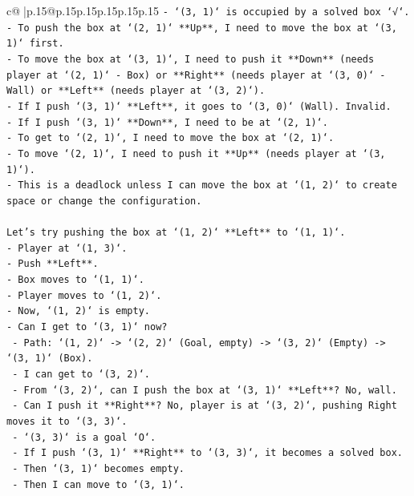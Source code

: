 \documentclass{article}
\begin{document}
{\begin{supertabular}{c@{$\;$}|p{.15\linewidth}@{}p{.15\linewidth}p{.15\linewidth}p{.15\linewidth}p{.15\linewidth}p{.15\linewidth}}
{{{\texttt{{-} `(3, 1)` is occupied by a solved box `√`.} \\
\texttt{{-} To push the box at `(2, 1)` **Up**, I need to move the box at `(3, 1)` first.} \\
\texttt{{-} To move the box at `(3, 1)`, I need to push it **Down** (needs player at `(2, 1)` {-} Box) or **Right** (needs player at `(3, 0)` {-} Wall) or **Left** (needs player at `(3, 2)`).} \\
\texttt{{-} If I push `(3, 1)` **Left**, it goes to `(3, 0)` (Wall). Invalid.} \\
\texttt{{-} If I push `(3, 1)` **Down**, I need to be at `(2, 1)`.} \\
\texttt{{-} To get to `(2, 1)`, I need to move the box at `(2, 1)`.} \\
\texttt{{-} To move `(2, 1)`, I need to push it **Up** (needs player at `(3, 1)`).} \\
\texttt{{-} This is a deadlock unless I can move the box at `(1, 2)` to create space or change the configuration.} \\
\\ 
\texttt{Let's try pushing the box at `(1, 2)` **Left** to `(1, 1)`.} \\
\texttt{{-} Player at `(1, 3)`.} \\
\texttt{{-} Push **Left**.} \\
\texttt{{-} Box moves to `(1, 1)`.} \\
\texttt{{-} Player moves to `(1, 2)`.} \\
\texttt{{-} Now, `(1, 2)` is empty.} \\
\texttt{{-} Can I get to `(3, 1)` now?} \\
\texttt{  {-} Path: `(1, 2)` {-}> `(2, 2)` (Goal, empty) {-}> `(3, 2)` (Empty) {-}> `(3, 1)` (Box).} \\
\texttt{  {-} I can get to `(3, 2)`.} \\
\texttt{  {-} From `(3, 2)`, can I push the box at `(3, 1)` **Left**? No, wall.} \\
\texttt{  {-} Can I push it **Right**? No, player is at `(3, 2)`, pushing Right moves it to `(3, 3)`.} \\
\texttt{    {-} `(3, 3)` is a goal `O`.} \\
\texttt{    {-} If I push `(3, 1)` **Right** to `(3, 3)`, it becomes a solved box.} \\
\texttt{    {-} Then `(3, 1)` becomes empty.} \\
\texttt{    {-} Then I can move to `(3, 1)`.} \\
}}}
\end{supertabular}}
\end{document}
